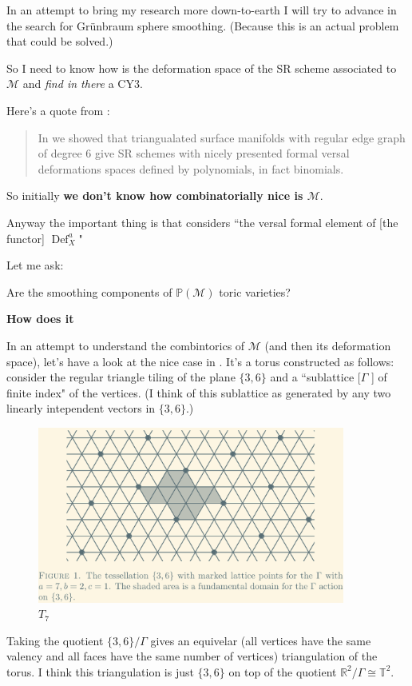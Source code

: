 In an attempt to bring my research more down-to-earth I will try to advance in the search for Grünbraum sphere smoothing. (Because this is an actual problem that could be solved.)

So I need to know how is the deformation space of the SR scheme associated to \(\mathcal{M}\) and \textit{find in there} a CY3.

Here's a quote from \cite{jan1}:
\begin{quotation}
	In \cite{jan2} we showed that triangualated surface manifolds with regular edge graph of degree 6 give SR schemes with nicely presented formal versal deformations spaces defined by polynomials, in fact binomials.
\end{quotation}
So initially \textbf{we don't know how combinatorially nice is \(\mathcal{M}\)}.

Anyway the important thing is that \cite{jan1} considers ``the versal formal element of [the functor] \(\operatorname{Def}_{X}^a\)"

Let me ask:
\begin{question}\leavevmode
	Are the smoothing components of \(\mathbb{P}(\mathcal{M})\) toric varieties?
\end{question}

\textbf{How \cite{jan1} does it} 

In an attempt to understand the combintorics of \(\mathcal{M}\) (and then its deformation space), let's have a look at the nice case in \cite{jan1}. It's a torus constructed as follows: consider the regular triangle tiling of the plane \(\{3,6\}\) and a ``sublattice [\(\Gamma\) ] of finite index" of the vertices. {\color{6}(I think of this sublattice as generated by any two linearly intependent vectors in \(\{3,6\}\).)}

\begin{figure}[H]
	\centering
	\includegraphics[width=0.9\textwidth]{fig3}
	\caption*{$T_7$}
\end{figure}
Taking the quotient \(\{3,6\}/\Gamma\) gives an equivelar (all vertices have the same valency and all faces have the same number of vertices) triangulation of the torus. {\color{6}I think this triangulation is just \(\{3,6\}\) on top of the quotient \(\mathbb{R}^2/\Gamma\cong \mathbb{T}^2\).}

